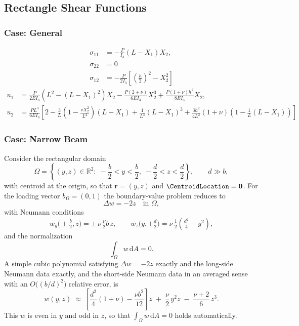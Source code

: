 \subsection{Rectangle Shear Functions}
\subsubsection{Case: General}
\cite{zienkiewicz2025finite}
\begin{equation*}
    \begin{aligned}
\sigma_{11} & =-\frac{P}{I_3} (L-X_1) X_2, \\
\sigma_{22} & =0 \\
\sigma_{12} & =-\frac{P}{2 I_3}\left[\left(\frac{h}{2}\right)^2-X_2^2\right]
\end{aligned}
\end{equation*}
\begin{equation*}
\begin{aligned}
u_1&=\frac{P}{2 E I_3}\left(L^2-(L-X_1)^2\right) X_2-\frac{P(2+\nu)}{6 E I_3} X_2^3+\frac{P(1+\nu) h^2}{8 E I_3} X_2, \\
u_2&=\frac{P L^3}{6 E I_3}\left[
  2-\frac{3}{L}\left(1-\frac{\nu X_2^2}{L^2}\right)(L-X_1)+\frac{1}{L^3}(L-X_1)^3+\frac{3 h^2}{4 L^2}(1+\nu)\left(1-\frac{1}{L}(L-X_1)\right)
\right]
\end{aligned}
\end{equation*}

\subsubsection{Case: Narrow Beam}
Consider the rectangular domain
\[
\Omega = \left\{(y,z)\in\mathbb R^2:\; -\frac b2<y<\frac b2,\; -\frac d2<z<\frac d2\right\},
\qquad d\gg b,
\]
with centroid at the origin, so that $\bm{r}=(y,z)$ and $\CentroidLocation=\mathbf{0}$.
For the loading vector $b_\Omega=(0,1)$ the boundary-value problem reduces to
\[
\Delta w = -2 z \quad \text{in }\Omega,
\]
with Neumann conditions
\[
w_y\Big(\pm\tfrac b2,z\Big) = \pm\,\nu\,\tfrac{\nu}{2}b\,z,
\qquad
w_z\Big(y,\pm\tfrac d2\Big) = \nu\,\tfrac12\left(\tfrac{d^2}{4}-y^2\right),
\]
and the normalization
\[
\int_\Omega w\,\mathrm dA = 0.
\]
A simple cubic polynomial satisfying $\Delta w=-2z$ exactly and the long-side Neumann data exactly, and the short-side Neumann data in an averaged sense with an $O\big((b/d)^2\big)$ relative error, is
\[
w(y,z)\;\approx\;
\left[\frac{d^2}{4}(1+\nu)-\frac{\nu b^2}{12}\right]z
\;+\;\frac{\nu}{2}\,y^2 z
\;-\;\frac{\nu+2}{6}\,z^3.
\]
This $w$ is even in $y$ and odd in $z$, so that $\displaystyle \int_\Omega w\,\mathrm dA=0$ holds automatically.

